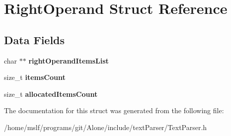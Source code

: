 \hypertarget{struct_right_operand}{}\section{Right\+Operand Struct Reference}
\label{struct_right_operand}
\subsection*{Data Fields}
\begin{DoxyCompactItemize}
\item 
\hypertarget{struct_right_operand_aab9e2a97e1c9ef112e0858f0ca253e9b}{}\label{struct_right_operand_aab9e2a97e1c9ef112e0858f0ca253e9b} 
char $\ast$$\ast$ {\bfseries right\+Operand\+Items\+List}
\item 
\hypertarget{struct_right_operand_a48e4ac11eaaa4c16805d455ffe2c5f5f}{}\label{struct_right_operand_a48e4ac11eaaa4c16805d455ffe2c5f5f} 
size\+\_\+t {\bfseries items\+Count}
\item 
\hypertarget{struct_right_operand_aeec70ba2a764db8a757dbd935e169d4c}{}\label{struct_right_operand_aeec70ba2a764db8a757dbd935e169d4c} 
size\+\_\+t {\bfseries allocated\+Items\+Count}
\end{DoxyCompactItemize}


The documentation for this struct was generated from the following file\+:\begin{DoxyCompactItemize}
\item 
/home/mslf/programs/git/\+Alone/include/text\+Parser/Text\+Parser.\+h\end{DoxyCompactItemize}
